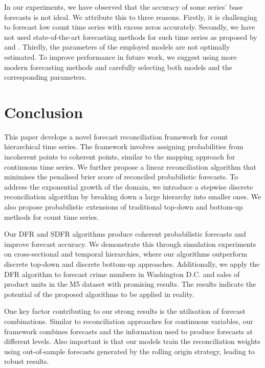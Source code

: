 \documentclass[a4paper,review,12pt,authoryear]{elsarticle}
\theoremstyle{definition}
\begin{document}
     In our experiments, we have observed that the accuracy of some series' base forecasts is not ideal.
     We attribute this to three reasons. Firstly, it is challenging to forecast low count time series with excess zeros accurately.
     Secondly, we have not used state-of-the-art forecasting methods for such time series as proposed by \cite{berryBayesianForecastingMany2020a} and \cite{weissEfficientAccountingEstimation2022}.
     Thirdly, the parameters of the employed models are not optimally estimated.
     To improve performance in future work, we suggest using more modern forecasting methods and carefully selecting both models and the corresponding parameters.





     \section{Conclusion}
     \label{sec:conclusion}

     This paper develops a novel forecast reconciliation framework for count hierarchical time series.
     The framework involves assigning probabilities from incoherent points to coherent points, similar to the mapping approach for continuous time series.
     We further propose a linear reconciliation algorithm that minimises the penalised brier score of reconciled probabilistic forecasts.
     To address the exponential growth of the domain, we introduce a stepwise discrete reconciliation algorithm by breaking down a large hierarchy into smaller ones.
     We also propose probabilistic extensions of traditional top-down and bottom-up methods for count time series.

     Our DFR and SDFR algorithms produce coherent probabilistic forecasts and improve forecast accuracy.
     We demonstrate this through simulation experiments on cross-sectional and temporal hierarchies, where our algorithms outperform discrete top-down and discrete bottom-up approaches. Additionally, we apply the DFR algorithm to forecast crime numbers in Washington D.C. and sales of product units in the M5 dataset with promising results.
     The results indicate the potential of the proposed algorithms to be applied in reality.

     One key factor contributing to our strong results is the utilisation of forecast combinations.
     Similar to reconciliation approaches for continuous variables, our framework combines forecasts and the information used to produce forecasts at different levels.
     Also important is that our models train the reconciliation weights using out-of-sample forecasts generated by the rolling origin strategy, leading to robust results.
\end{document}
